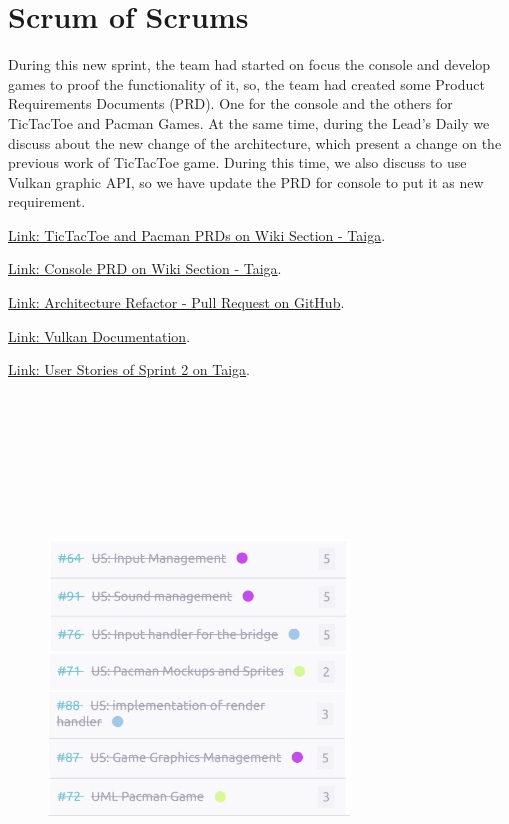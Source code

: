 \hypertarget{sos-s2} {
\section{Scrum of Scrums}\label{Scrum of Scrums} 
During this new sprint, the team had started on focus the console and develop 
games to proof the functionality of it, so, the team had created some Product 
Requirements Documents (PRD). One for the console and the others for TicTacToe 
and Pacman Games.
At the same time, during the Lead's Daily we discuss about the new change of 
the architecture, which present a change on the previous work of TicTacToe game. 
During this time, we also discuss to use Vulkan graphic API, so we have update 
the PRD for console to put it as new requirement.
}

\href{https://tree.taiga.io/project/joseluis-teran-coffeetime/wiki/fronted-team}{Link: TicTacToe and Pacman PRDs on Wiki Section - Taiga}.

\href{https://tree.taiga.io/project/joseluis-teran-coffeetime/wiki/backend-team}{Link: Console PRD on Wiki Section - Taiga}.

\href{https://github.com/Pending-Name-21/arquitecture/pull/5/files}{Link: Architecture Refactor - Pull Request on GitHub}.

\href{https://docs.vulkan.org/tutorial/latest/02_Development_environment.html#_linux}{Link: Vulkan Documentation}.

\href{https://tree.taiga.io/project/joseluis-teran-coffeetime/taskboard/sprint-2-12274}{Link: User Stories of Sprint 2 on Taiga}.

\begin{figure}
\centering
\includegraphics[width=8cm, height=15cm]{./assets/us-s2.png}
\end{figure}

